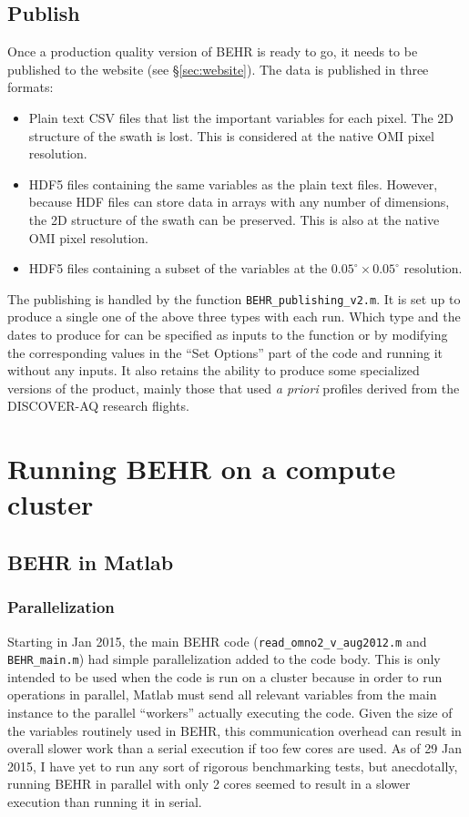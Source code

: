 \documentclass[12pt]{article}
\begin{document}
	
	\subsection{Publish}
	Once a production quality version of BEHR is ready to go, it needs to be published to the website (see \S\ref{sec:website}). The data is published in three formats:
	\begin{itemize}
	\item Plain text CSV files that list the important variables for each pixel. The 2D structure of the swath is lost. This is considered at the native OMI pixel resolution.
	\item HDF5 files containing the same variables as the plain text files. However, because HDF files can store data in arrays with any number of dimensions, the 2D structure of the swath can be preserved. This is also at the native OMI pixel resolution.
	\item HDF5 files containing a subset of the variables at the $0.05^\circ \times 0.05^\circ$ resolution.
	\end{itemize}
	
	The publishing is handled by the function \lstinline$BEHR_publishing_v2.m$. It is set up to produce a single one of the above three types with each run. Which type and the dates to produce for can be specified as inputs to the function or by modifying the corresponding values in the ``Set Options'' part of the code and running it without any inputs. It also retains the ability to produce some specialized versions of the product, mainly those that used \emph{a priori} profiles derived from the DISCOVER-AQ research flights.

\section{Running BEHR on a compute cluster} \label{sec:Cluster}
	\subsection{BEHR in Matlab}
	\subsubsection{Parallelization}
		Starting in Jan 2015, the main BEHR code (\texttt{read\_omno2\_v\_aug2012.m} and \texttt{BEHR\_main.m}) had simple parallelization added to the code body.  This is only intended to be used when the code is run on a cluster because in order to run operations in parallel, Matlab must send all relevant variables from the main instance to the parallel ``workers'' actually executing the code.  Given the size of the variables routinely used in BEHR, this communication overhead can result in overall slower work than a serial execution if too few cores are used.  As of 29 Jan 2015, I have yet to run any sort of rigorous benchmarking tests, but anecdotally, running BEHR in parallel with only 2 cores seemed to result in a slower execution than running it in serial.
		
\end{document}
